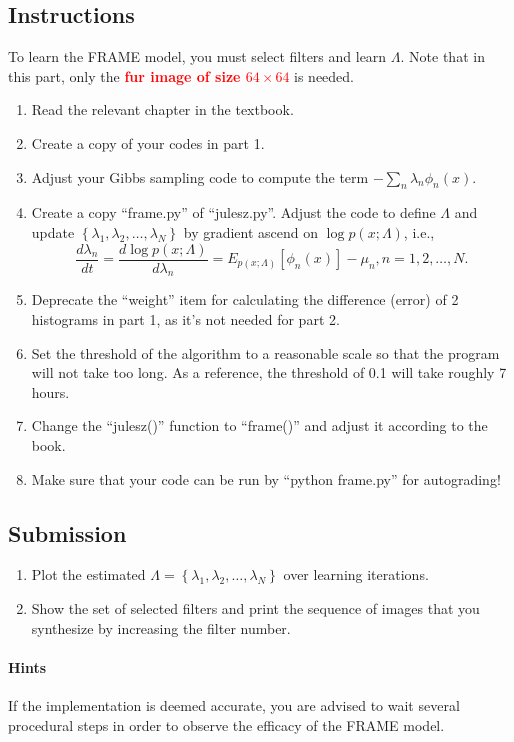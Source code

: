 \documentclass[11pt]{article}
\begin{document}
\subsection{Instructions}

To learn the FRAME model, you must select filters and learn $\Lambda$. Note that in this part, only the \textbf{\textcolor{red}{fur image of size $64 \times 64$}} is needed.
\begin{enumerate}
    \item Read the relevant chapter in the textbook.
    \item Create a copy of your codes in part 1.
    \item  Adjust your Gibbs sampling code to compute the term $-\sum _{n}\lambda _{n}\phi _{n}(x)$.
    \item Create a copy ``frame.py'' of ``julesz.py''. Adjust the code to define $\Lambda $ and update $\left\{\lambda _{1},\lambda _{2},\ldots ,\lambda _{N}\right\}$ by gradient ascend on $\log p(x;\Lambda )$, i.e., 
    \begin{equation*}
        \frac{d\lambda _{n}}{dt}=\frac{d\log p(x;\Lambda ) }{d\lambda _{n}}=E_{p\left(x;\Lambda \right)}\left[\phi _{n}\left(x\right)\right]-\mu _{n} , n=1,2,\ldots ,N.
    \end{equation*}
    \item Deprecate the ``weight'' item for calculating the difference (error) of 2 histograms in part 1, as it's not needed for part 2.
    \item Set the threshold of the algorithm to a reasonable scale so that the program will not take too long. As a reference, the threshold of 0.1 will take roughly 7 hours.
    \item Change the ``julesz()'' function to ``frame()'' and adjust it according to the book.
    \item Make sure that your code can be run by ``python frame.py'' for autograding!
\end{enumerate}

\subsection{Submission}

\begin{enumerate}
    \item Plot the estimated $\Lambda =\left\{\lambda _{1},\lambda _{2},\ldots ,\lambda _{N}\right\}$ over learning iterations.
    \item Show the set of selected filters and print the sequence of images that you synthesize by increasing the filter number. 
\end{enumerate}

\paragraph{Hints}

If the implementation is deemed accurate, you  are advised to wait several procedural steps in order to observe the efficacy of the FRAME model.
\end{document}
